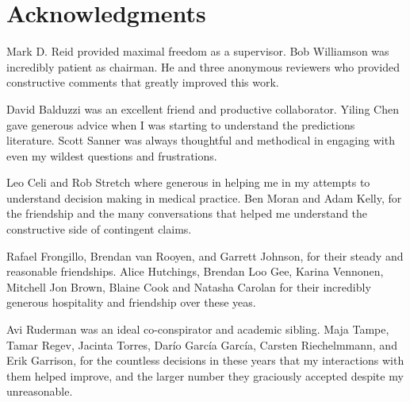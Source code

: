 \chapter*{Acknowledgments}

Mark D. Reid provided maximal freedom as a supervisor.
Bob Williamson was incredibly patient as chairman.
He and three anonymous reviewers who provided constructive comments that greatly improved this work.  

David Balduzzi was an excellent friend and productive collaborator.
Yiling Chen gave generous advice when I was starting to understand the predictions literature.
Scott Sanner was always thoughtful and methodical in engaging with even my wildest questions and frustrations.


Leo Celi and Rob Stretch where generous in helping me in my attempts to understand decision making in medical practice.
Ben Moran and Adam Kelly, for the friendship and the many conversations that helped me understand the constructive side of contingent claims.

Rafael Frongillo, Brendan van Rooyen, and Garrett Johnson, for their steady and reasonable friendships.
Alice Hutchings, Brendan Loo Gee, Karina Vennonen, Mitchell Jon Brown, Blaine Cook and Natasha Carolan for their incredibly generous hospitality and friendship over these yeas.

Avi Ruderman was an ideal co-conspirator and academic sibling. 
Maja Tampe, Tamar Regev, Jacinta Torres, Dar\'io Garc\'ia Garc\'ia, Carsten Riechelmmann, and Erik Garrison, for the countless decisions in these years that my interactions with them helped improve, and the larger number they graciously accepted despite my unreasonable. 


